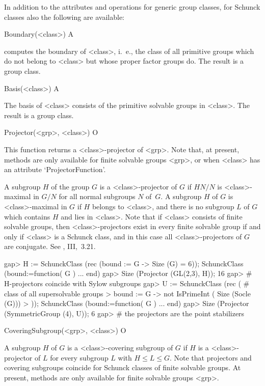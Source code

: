 \null


In addition to the attributes and operations for generic group classes,
for Schunck classes also the following are available:

\>Boundary(<class>) A

computes the boundary of <class>, i.~e., the class of all
primitive groups which do not belong to <class> but whose proper
factor groups do. The result is a group class. 

\>Basis(<class>) A

The basis of <class> consists of the primitive solvable 
groups in <class>. The result is a group class. 

\>Projector(<grp>, <class>) O

This function returns a <class>-projector of <grp>.
Note that, at present, methods are only available for finite
solvable groups <grp>, or when <class> has an attribute `ProjectorFunction'.

A subgroup 
$H$ of the group $G$ is a <class>-projector of $G$ if $H N/N$ is
<class>-maximal in $G/N$ for all normal subgroups $N$ of~$G$. A subgroup $H$
of $G$ is <class>-maximal in $G$ if $H$ belongs to <class>, and there is no
subgroup $L$ of $G$ which contains $H$ and lies in <class>. Note that if
<class> consists of finite solvable groups, then <class>-projectors exist in
every finite solvable group if and only if <class> is a Schunck class, and in
this case all <class>-projectors of
$G$ are conjugate. See \cite{DH92}, III,~3.21.

\beginexample
gap> H := SchunckClass (rec (bound := G -> Size (G) = 6));
SchunckClass (bound:=function( G ) ... end)
gap> Size (Projector (GL(2,3), H)); 
16 
gap> # H-projectors coincide with Sylow subgroups
gap> U := SchunckClass (rec ( # class of all supersolvable groups
>    bound := G -> not IsPrimeInt ( Size (Socle (G)))
> )); 
SchunckClass (bound:=function( G ) ... end)
gap> Size (Projector (SymmetricGroup (4), U));
6 
gap> # the projectors are the point stabilizers
\endexample

\>CoveringSubgroup(<grp>, <class>) O

A subgroup $H$ of $G$ is a <class>-covering subgroup of $G$ if $H$ is a
<class>-projector of $L$ for every subgroup $L$ with $H \leq L \leq G$.
Note that projectors and covering subgroups coincide for Schunck classes of
finite solvable groups. At present, methods are only available for finite
solvable groups <grp>.

